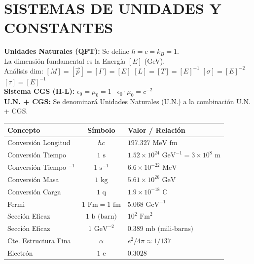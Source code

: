     \section{SISTEMAS DE UNIDADES Y CONSTANTES}
    \textbf{Unidades Naturales (QFT):} Se define $\hbar = c = k_B = 1$.
    \\ La dimensión fundamental es la Energía $[E]$ (GeV).
    \\ Análisis dim: $[M]= [\vec{p}] = [\Gamma] = [E]$\;\;\; $[L] = [T] = [E]^{-1}$ \;\;\; $[\sigma] = [E]^{-2}$ \;\;\; $[\tau]= [E]^{-1}$\\
    \textbf{Sistema CGS (H-L):} $\epsilon_0 = \mu_0 = 1\; \; \; \epsilon_0 \cdot \mu_0 = c^{-2}$ \\
    \textbf{U.N. + CGS:} Se denominará Unidades Naturales (U.N.) a la combinación U.N. + CGS. 
    \begin{center}
        \renewcommand{\arraystretch}{1.1}
        \begin{tabular}{|l|c|l|}
            \hline
            \textbf{Concepto}    & \textbf{Símbolo}     & \textbf{Valor / Relación}                 \\ \hline
            Conversión Longitud  & $\hbar c$            & $197.327 \text{ MeV fm}$                  \\ \hline
            Conversión Tiempo    & $1 \text{ s}$        & $1.52 \times 10^{24} \text{ GeV}^{-1} = 3\times 10^8 \text{ m}$    \\ \hline
            Conversión Tiempo $^{-1}$    & $1 \text{ s}^{-1}$     & $6.6 \times 10^{-22} \text{ MeV}$ \\ \hline
            Conversión Masa      & $1 \text{ kg}$       & $5.61 \times 10^{26} \text{ GeV}$         \\ \hline
            Conversión Carga     & $1 \text{ q}$        & $1.9 \times 10^{-18} \text{ C}$         \\ \hline
            Fermi                & $1 \text{ Fm} = 1 \text{ fm}$       & $5.068 \text{ GeV}^{-1}$                  \\ \hline
            Sección Eficaz       & $1 \text{ b (barn)}$ & $10^2  \text{ Fm}^{2} $                        \\ \hline
            Sección Eficaz       & $1 \text{ GeV}^{-2}$ & $0.389 \text{ mb (mili-barns)}$                        \\ \hline
            Cte. Estructura Fina & $\alpha$             & $e^2/4\pi \approx 1/137$                  \\ \hline
            Electrón             & $1 \text{ e}$        & $0.3028$                        \\ \hline

\end{tabular}
\end{center}
